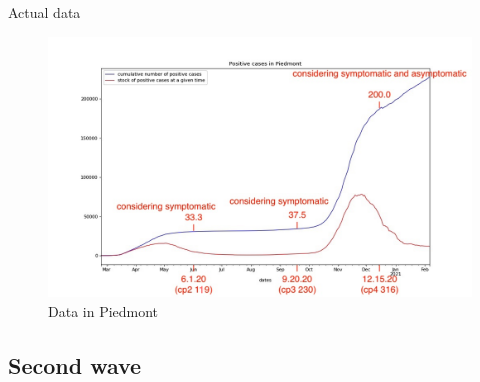 \documentclass[8pt]{beamer}
\begin{document}
\begin{frame}{Actual data}

\begin{figure}[H]
\center
\includegraphics[scale=0.25]{andamento900annotato.jpg}
\caption{Data in Piedmont} 
\label{data}
\end{figure}


\end{frame}



\subsection{Second wave}
\end{document}
